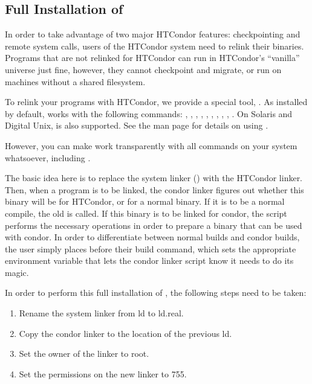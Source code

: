 \subsection{\label{sec:full-condor-compile}Full Installation of
} 

In order to take advantage of two major HTCondor features: checkpointing
and remote system calls, users of the HTCondor system need to relink
their binaries.  Programs that are not relinked for HTCondor can run in
HTCondor's ``vanilla'' universe just fine, however, they cannot
checkpoint and migrate, or run on machines without a shared filesystem.

To relink your programs with HTCondor, we provide a special tool,
.  As installed by default,  works
with the following commands: , , ,
, , , , ,
, .  On Solaris and Digital Unix,  is
also supported.  See the  man page for details on
using .

However, you can make  work transparently with all
commands on your system whatsoever, including .  

The basic idea here is to replace the system linker () with
the HTCondor linker.  Then, when a program is to be linked, the condor
linker figures out whether this binary will be for HTCondor, or for a
normal binary.  If it is to be a normal compile, the old  is
called.  If this binary is to be linked for condor, the script
performs the necessary operations in order to prepare a binary that
can be used with condor.  In order to differentiate between normal
builds and condor builds, the user simply places 
 before their build command, which sets the
appropriate environment variable that lets the condor linker script
know it needs to do its magic.

In order to perform this full installation of , the
following steps need to be taken:
	
\begin{enumerate}
	\item Rename the system linker from ld to ld.real.
	\item Copy the condor linker to the location of the previous ld.
	\item Set the owner of the linker to root.
	\item Set the permissions on the new linker to 755.
\end{enumerate}

